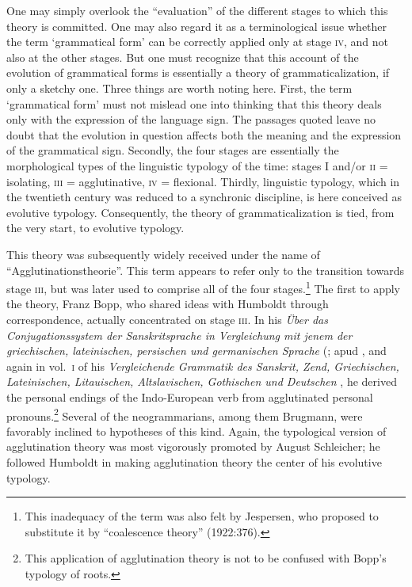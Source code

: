 One may simply overlook the “evaluation” of the different stages to which this theory is committed. One may also regard it as a terminological issue whether the term ‘grammatical form’ can be correctly applied only at stage \textsc{iv}, and not also at the other stages. But one must recognize that this account of the evolution of grammatical forms is essentially a theory of grammaticalization, if only a sketchy one. Three things are worth noting here. First, the term ‘grammatical form’ must not mislead one into thinking that this theory deals only with the  expression of the language sign. The passages quoted leave no doubt that the evolution in question affects both the meaning and the expression of the grammatical sign. Secondly, the four stages are essentially the morphological types of the linguistic typology of the time: stages I and/or \textsc{ii} = isolating, \textsc{iii} = agglutinative, \textsc{iv} = flexional. Thirdly, linguistic typology, which in the twentieth century was reduced to a synchronic discipline, is here conceived as evolutive typology. Consequently, the theory of grammaticalization is tied, from the very start, to evolutive typology.

This theory was subsequently widely received under the name of “Agglutinationstheorie”.\label{Agglutinationstheorie} This term appears to refer only to the transition towards stage \textsc{iii}, but was later used to comprise all of the four stages.\footnote{This inadequacy of the term was also felt by Jespersen, who proposed to substitute it by “coalescence theory” (1922:376).} The first to apply the theory, Franz Bopp\label{Bopp}, who shared ideas with Humboldt through correspondence, actually concentrated on stage \textsc{iii}. In his \textit{Über das Conjugationssystem der Sanskritsprache in Vergleichung mit jenem der griechischen, lateinischen, persischen und germanischen Sprache} (\citeyear[147f]{Bopp1816}; apud \citet[177]{Arens1969}, and again in vol.~\textsc{i} of his \textit{Vergleichende Grammatik des Sanskrit, Zend, Griechischen, Lateinischen, Litauischen, Altslavischen, Gothischen und Deutschen} \citep{Bopp1833}, he derived the personal endings of the Indo-European verb from agglutinated personal pronouns.\footnote{This application of agglutination theory is not to be confused with Bopp's typology of roots.} Several of the neogrammarians, among them Brugmann, were favorably inclined to hypotheses of this kind. Again, the typological version of agglutination theory was most vigorously promoted by August Schleicher; he followed Humboldt in making agglutination theory the center of his evolutive typology.

